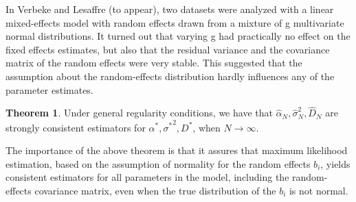 \documentclass{article}
\begin{document}
\begin{itemize}
In Verbeke and Lesaffre (to appear), two datasets were analyzed with a linear mixed-effects model with random effects drawn from a mixture of g multivariate normal distributions. It turned out that varying g had practically no effect on the fixed effects estimates, but also that the residual variance and the covariance matrix of the random effects were very stable. This suggested that the assumption about the random-effects distribution hardly influences any of the parameter estimates.\par 


{\bf Theorem 1}. Under general regularity conditions, we have that $\hat{\alpha}_N, \hat{\sigma}^2_N, \hat{D}_N$ are strongly consistent estimators for ${\alpha}^*, {\sigma^*}^2, D^*$, when $N \rightarrow \infty$.\par 

The importance of the above theorem is that it assures that maximum likelihood estimation, based on the assumption of normality for the random effects $b_i$, yields consistent estimators for all parameters in the model, including the random-effects covariance matrix, even when the true distribution of the $b_i$ is not normal.

\end{itemize}
\end{document}
